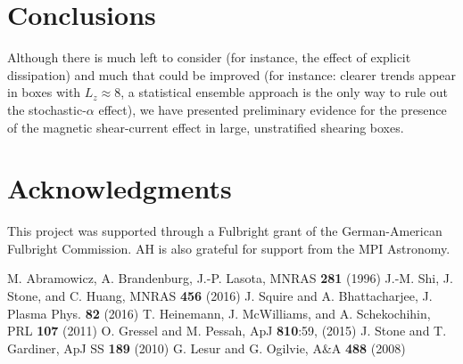 \documentclass{epsconf}
\begin{document}
\section{Conclusions}
Although there is much left to consider (for instance, the effect of explicit dissipation) and much that could be improved (for instance: clearer trends appear in boxes with $L_z\approx8$, a statistical ensemble approach is the only way to rule out the stochastic-$\alpha$ effect), we have presented preliminary evidence for the presence of the magnetic shear-current effect in large, unstratified shearing boxes. 
\section{Acknowledgments}
This project was supported through a Fulbright grant of the German-American Fulbright Commission. AH is also grateful for support from the MPI Astronomy.

\begin{thebibliography}{99}
M. Abramowicz, A. Brandenburg, J.-P. Lasota, MNRAS {\bf 281} (1996)
J.-M. Shi, J. Stone, and C. Huang, MNRAS {\bf 456} (2016)
J. Squire and A. Bhattacharjee, J. Plasma Phys. {\bf 82} (2016)
T. Heinemann, J. McWilliams, and A. Schekochihin, PRL {\bf 107} (2011)
O. Gressel and M. Pessah, ApJ {\bf 810}:59, (2015)
J. Stone and T. Gardiner, ApJ SS {\bf 189} (2010)
G. Lesur and G. Ogilvie, A\&A {\bf 488} (2008)
\end{thebibliography}
\end{document}
